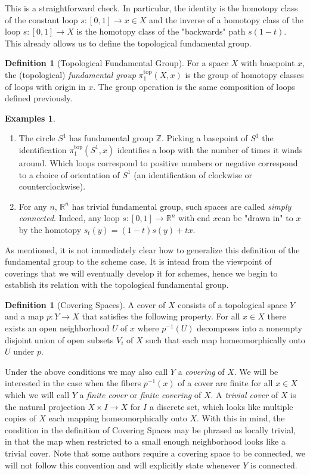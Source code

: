 \documentclass{article}
\theoremstyle{definition}
\newtheorem{definition}[theorem]{Definition}
\newtheorem{examples}[theorem]{Examples}
\theoremstyle{remark}
\theoremstyle{plain}
\newcommand{\R}{\mathbb{R}}
\newcommand{\Z}{\mathbb{Z}}
\begin{document}
This is a straightforward check. 
In particular, the identity is the homotopy class of the constant loop $s: [0,1] \to x \in X$ and the inverse of a homotopy class of the loop $s: [0,1] \to X$ is the homotopy class of the "backwards" path $s(1-t)$.
This already allows us to define the topological fundamental group.
\begin{definition}[Topological Fundamental Group]
	For a space $X$ with basepoint $x$, the (topological) \textit{fundamental group} $\pi^{\text{top}}_1(X,x)$	is the group of homotopy classes of loops with origin in $x$.
	The group operation is the same composition of loops defined previously.
\end{definition}

\begin{examples} \text{} 
	\begin{enumerate}
		\item The circle $S^1$ has fundamental group $\Z$. 
			Picking a basepoint of $S^1$ the identification $\pi_1^{\text{top}}(S^1,x)$ identifies a loop with the number of times it winds around.
			Which loops correspond to positive numbers or negative correspond to a choice of orientation of $S^1$ (an identification of clockwise or counterclockwise). 
		\item For any $n$, $\R^n$ has trivial fundamental group, such spaces are called \textit{simply connected}.
			Indeed, any loop $s: [0,1] \to \R^n$ with end $x $can be "drawn in" to $x$ by the homotopy $s_t(y) = (1-t)s(y) + tx$.
	\end{enumerate}
	
\end{examples}

As mentioned, it is not immediately clear how to generalize this definition of the fundamental group to the scheme case.
It is intead from the viewpoint of coverings that we will eventually develop it for schemes, hence we begin to establish its relation with the topological fundamental group.

\begin{definition}[Covering Spaces]
A cover of $X$ consists of a topological space $Y$ and a map $p:Y \to X$ that satisfies the following property. 
	For all $x \in X$ there exists an open neighborhood $U$ of $x$ where $p^{-1}(U)$ decomposes into a nonempty disjoint union of open subsets $V_i$ of $X$ such that each map homeomorphically onto $U$ under $p$.
\end{definition}

Under the above conditions we may also call $Y$ a \textit{covering} of $X$.
We will be interested in the case when the fibers $p^{-1}(x)$ of a cover are finite for all $x \in X$ which we will call $Y$ a \textit{finite cover} or \textit{finite covering} of $X$.
A \textit{trivial cover} of $X$ is the natural projection $X \times I \to X$ for $I$ a discrete set, which looks like multiple copies of $X$ each mapping homeomorphically onto $X$.
With this in mind, the condition in the definition of Covering Spaces may be phrased as locally trivial, in that the map when restricted to a small enough neighborhood looks like a trivial cover.
Note that some authors require a covering space to be connected, we will not follow this convention and will explicitly state whenever $Y$ is connected.
\end{document}
